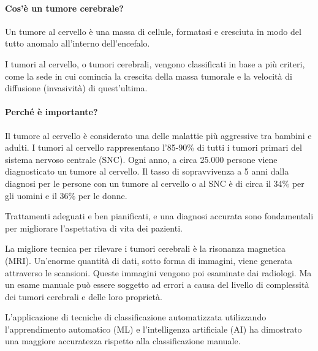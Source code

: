         \paragraph{Cos'è un tumore cerebrale?}
        Un tumore al cervello è una massa di cellule, formatasi e cresciuta in modo del tutto anomalo all'interno dell'encefalo.
        
        I tumori al cervello, o tumori cerebrali, vengono classificati in base a più criteri, come la sede in cui comincia la crescita della massa tumorale e la velocità di diffusione (invasività) di quest'ultima.
        
        \paragraph{Perché è importante?}
        Il tumore al cervello è considerato una delle malattie più aggressive tra bambini e adulti. %
        I tumori al cervello rappresentano l'85-90$\%$ di tutti i tumori primari del sistema nervoso centrale (SNC). Ogni anno, a circa 25.000 persone viene diagnosticato un tumore al cervello. Il tasso di sopravvivenza a 5 anni dalla diagnosi per le persone con un tumore al cervello o al SNC è di circa il 34$\%$ per gli uomini e il 36$\%$ per le donne.
        
        Trattamenti adeguati e ben pianificati, e una diagnosi accurata sono fondamentali per migliorare l'aspettativa di vita dei pazienti.
        
        La migliore tecnica per rilevare i tumori cerebrali è la risonanza magnetica (MRI). Un'enorme quantità di dati, sotto forma di immagini, viene generata attraverso le scansioni. Queste immagini vengono poi esaminate dai radiologi. Ma un esame manuale può essere soggetto ad errori a causa del livello di complessità dei tumori cerebrali e delle loro proprietà.
        
        L'applicazione di tecniche di classificazione automatizzata utilizzando l'apprendimento automatico (ML) e l'intelligenza artificiale (AI) ha dimostrato una maggiore accuratezza rispetto alla classificazione manuale.
        

